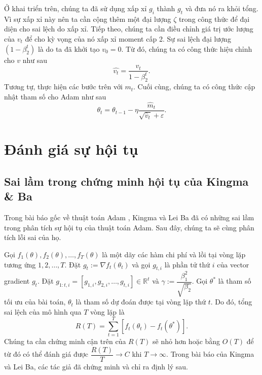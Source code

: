 \documentclass[11pt,oneside,a4paper]{report}
\theoremstyle{definition}
\begin{document}
Ở khai triển trên, chúng ta đã sử dụng xấp xỉ $g_i$ thành $g_t$ và đưa nó ra khỏi tổng. Vì sự xấp xỉ này nên ta cần cộng thêm một đại lượng $\zeta$ trong công thức để đại diện cho sai lệch do xấp xỉ. Tiếp theo, chúng ta cần điều chỉnh giá trị ước lượng của $v_t$ để cho kỳ vọng của nó xấp xỉ moment cấp 2. Sự sai lệch đại lượng $\left(1-\beta_2^t\right)$ là do ta đã khởi tạo $v_0=0$. Từ đó, chúng ta có công thức hiệu chỉnh cho $v$ như sau
$$
\hat{v_t}=\dfrac{v_t}{1-\beta_2^t}.
$$
Tương tự, thực hiện các bước trên với $m_t$. Cuối cùng, chúng ta có công thức cập nhật tham số cho Adam như sau
$$
\theta_t=\theta_{t-1}-\eta \dfrac{\hat{m}_t}{\sqrt{\hat{v}_t}+\varepsilon}.
$$
\section{Đánh giá sự hội tụ}
\subsection{Sai lầm trong chứng minh hội tụ của Kingma \& Ba}
Trong bài báo gốc về thuật toán Adam \cite{7}, Kingma và Lei Ba đã có những sai lầm trong phân tích sự hội tụ của thuật toán Adam. Sau đây, chúng ta sẽ cùng phân tích lỗi sai của họ.

Gọi $f_1(\theta), f_2(\theta), \ldots, f_T(\theta)$ là một dãy các hàm chi phí và lồi tại vòng lặp tương ứng $1,2, \ldots, T$.
Đặt $g_t:=\nabla f_t\left(\theta_t\right)$ và gọi $g_{t, i}$ là phần tử thứ $i$ của vector gradient $g_t$.
Đặt $g_{1: t, i}=\left[g_{1, i}, g_{2, i}, \ldots, g_{t, i}\right] \in \mathbb{R}^t$ và $\gamma:=\dfrac{\beta_1^2}{\sqrt{\beta_2}}$.
Gọi $\theta^*$ là tham số tối ưu của bài toán, $\theta_t$ là tham số dự đoán được tại vòng lặp thứ $t$. Do đó, tổng sai lệch của mô hình qua $T$ vòng lặp là
$$
R(T)=\sum_{t=1}^T\left[f_t\left(\theta_t\right)-f_t\left(\theta^*\right)\right].
$$
Chúng ta cần chứng minh cận trên của $R(T)$ sẽ nhỏ hơn hoặc bằng $O(T)$ để từ đó có thể đánh giá được $\dfrac{R(T)}{T} \rightarrow C$ khi $T \rightarrow \infty$. Trong bài báo của Kingma và Lei Ba, các tác giả đã chứng minh và chỉ ra định lý sau.
\end{document}
